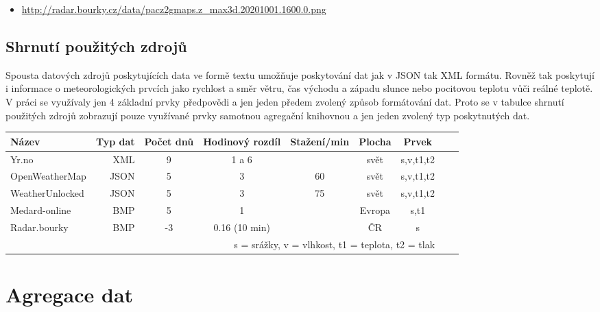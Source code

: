 \documentclass[czech,bachelor,dept460,male,csharp,cpdeclaration]{diploma}
\begin{document}
	\begin{itemize}
		\item \url{http://radar.bourky.cz/data/pacz2gmaps.z\_max3d.20201001.1600.0.png}
	\end{itemize}
	
	\section{Shrnutí použitých zdrojů}
	
	Spousta datových zdrojů poskytujících data ve formě textu umožňuje poskytování dat jak v JSON tak XML formátu. Rovněž tak poskytují i informace o meteorologických prvcích jako rychlost a směr větru, čas východu a západu slunce nebo pocitovou teplotu vůči reálné teplotě. V práci se využívaly jen 4 základní prvky předpovědi a jen jeden předem zvolený způsob formátování dat. Proto se v tabulce shrnutí použitých zdrojů zobrazují pouze využívané prvky samotnou agregační knihovnou a jen jeden zvolený typ poskytnutých dat.
	
	\begin{table}[h]
		
		
		\begin{tabular} {l r c c c c c c c}
			
			Název & Typ dat & Počet dnů & Hodinový rozdíl & Stažení/min & Plocha & Prvek \\
			\hline
			Yr.no & XML & 9 & 1 a 6 & & svět & s,v,t1,t2 \\ 
			OpenWeatherMap & JSON & 5 & 3 & 60 & svět & s,v,t1,t2 \\ 
			WeatherUnlocked & JSON & 5 & 3 & 75 & svět & s,v,t1,t2 \\ 
			Medard-online & BMP & 5 & 1 &  & Evropa & s,t1 \\ 
			Radar.bourky & BMP & -3 & 0.16 (10 min)& & ČR & s \\ 
			
			\multicolumn{7}{r}{\footnotesize *s = srážky, v = vlhkost, t1 = teplota, t2 = tlak}\\
			
		\end{tabular}
	\end{table}
	
	\chapter{Agregace dat}
	
\end{document}
